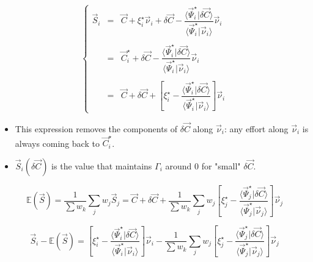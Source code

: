 \documentclass[aps,12pt]{revtex4}
\begin{document}
\begin{equation}
\left\lbrace
\begin{array}{rcl}
	\vec{S}_i & = & \vec{C} + \xi_i^\star \vec{\nu}_i
 + \delta\vec{C} - \dfrac{\langle \vec{\Psi}_i^\star \vert \delta\vec{C} \rangle}{\langle \vec{\Psi}_i^\star \vert \vec{\nu}_i \rangle
} \vec{\nu}_i  \\
\\
 & = & \vec{C}_i^\star + \delta\vec{C} - \dfrac{\langle \vec{\Psi}_i^\star \vert \delta\vec{C} \rangle}{\langle \vec{\Psi}_i^\star \vert \vec{\nu}_i \rangle
} \vec{\nu}_i \\
\\
& = & \vec{C} + \delta\vec{C} + \left[ \xi_i^\star - \dfrac{\langle \vec{\Psi}_i^\star \vert \delta\vec{C} \rangle}{\langle \vec{\Psi}_i^\star \vert \vec{\nu}_i \rangle
}\right] \vec{\nu}_i
\end{array}
\right.
\end{equation} 

\begin{itemize}
\item This expression removes the components of $\delta\vec{C}$ along $\vec{\nu}_i$: any effort along $\vec{\nu}_i$ is always coming back to $\vec{C}_i^\star$.

\item $\vec{S}_i(\delta\vec{C})$ is the value that maintains $\Gamma_i$ around 0 for "small" $\delta\vec{C}$.

\end{itemize}

\begin{equation}
	\mathbb{E}(\vec{S}) = \dfrac{1}{\sum w_k} \sum_j w_j \vec{S}_j = \vec{C}+\delta\vec{C} + \dfrac{1}{\sum w_k}\sum_j w_j\left[ \xi_j^\star - \dfrac{\langle \vec{\Psi}_j^\star \vert \delta\vec{C} \rangle}{\langle \vec{\Psi}_j^\star \vert \vec{\nu}_j \rangle
}\right] \vec{\nu}_j
\end{equation}
 
\begin{equation}
	\vec{S}_i - \mathbb{E}(\vec{S}) = \left[ \xi_i^\star - \dfrac{\langle \vec{\Psi}_i^\star \vert \delta\vec{C} \rangle}{\langle \vec{\Psi}_i^\star \vert \vec{\nu}_i \rangle
}\right] \vec{\nu}_i
-
\dfrac{1}{\sum w_k}\sum_j w_j\left[ \xi_j^\star - \dfrac{\langle \vec{\Psi}_j^\star \vert \delta\vec{C} \rangle}{\langle \vec{\Psi}_j^\star \vert \vec{\nu}_j \rangle
}\right] \vec{\nu}_j
\end{equation} 
\end{document}
